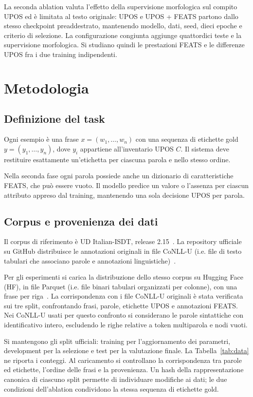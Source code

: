 \documentclass[12pt,a4paper]{report}
\newcommand{\modelid}[1]{{\small\path{#1}}}
\begin{document}
La seconda ablation valuta l'effetto della supervisione morfologica sul compito UPOS ed è limitata al testo originale: UPOS e UPOS + FEATS partono dallo stesso checkpoint preaddestrato, mantenendo modello, dati, seed, dieci epoche e criterio di selezione. La configurazione congiunta aggiunge quattordici teste e la supervisione morfologica. Si studiano quindi le prestazioni FEATS e le differenze UPOS fra i due training indipendenti.

\chapter{Metodologia}
\label{chap:methodology}
\section{Definizione del task}
Ogni esempio è una frase $x=(w_1,\ldots,w_n)$ con una sequenza di etichette gold $y=(y_1,\ldots,y_n)$, dove $y_i$ appartiene all'inventario UPOS $C$. Il sistema deve restituire esattamente un'etichetta per ciascuna parola e nello stesso ordine.

Nella seconda fase ogni parola possiede anche un dizionario di caratteristiche FEATS, che può essere vuoto. Il modello predice un valore o l'assenza per ciascun attributo appreso dal training, mantenendo una sola decisione UPOS per parola.

\section{Corpus e provenienza dei dati}
\label{sec:data-provenance}
Il corpus di riferimento è UD Italian-ISDT, release 2.15~\cite{isdt}. La repository ufficiale \modelid{UniversalDependencies/UD_Italian-ISDT} su GitHub distribuisce le annotazioni originali in file CoNLL-U (i.e. file di testo tabulari che associano parole e annotazioni linguistiche)~\cite{conllu}.

Per gli esperimenti si carica la distribuzione dello stesso corpus su Hugging Face (HF), in file Parquet (i.e. file binari tabulari organizzati per colonne), con una frase per riga~\cite{hfdata}. La corrispondenza con i file CoNLL-U originali è stata verificata sui tre split, confrontando frasi, parole, etichette UPOS e annotazioni FEATS. Nei CoNLL-U usati per questo confronto si considerano le parole sintattiche con identificativo intero, escludendo le righe relative a token multiparola e nodi vuoti.

Si mantengono gli split ufficiali: training per l'aggiornamento dei parametri, development per la selezione e test per la valutazione finale. La Tabella~\ref{tab:data} ne riporta i conteggi. Al caricamento si controllano la corrispondenza tra parole ed etichette, l'ordine delle frasi e la provenienza. Un hash della rappresentazione canonica di ciascuno split permette di individuare modifiche ai dati; le due condizioni dell'ablation condividono la stessa sequenza di etichette gold.
\end{document}
